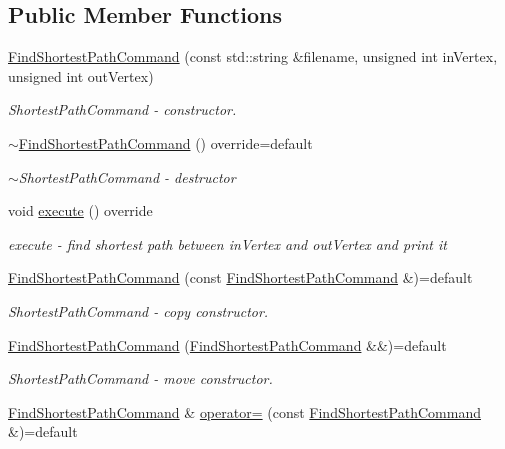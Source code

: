 \subsection*{Public Member Functions}
\begin{DoxyCompactItemize}
\item 
\hyperlink{a00005_a50a520c9a9fd4b962757be360b5e344f_a50a520c9a9fd4b962757be360b5e344f}{Find\+Shortest\+Path\+Command} (const std\+::string \&filename, unsigned int in\+Vertex, unsigned int out\+Vertex)
\begin{DoxyCompactList}\small\item\em Shortest\+Path\+Command -\/ constructor. \end{DoxyCompactList}\item 
\hyperlink{a00005_a69d019f4373486c4bf105dedc534271a_a69d019f4373486c4bf105dedc534271a}{$\sim$\+Find\+Shortest\+Path\+Command} () override=default
\begin{DoxyCompactList}\small\item\em $\sim$\+Shortest\+Path\+Command -\/ destructor \end{DoxyCompactList}\item 
void \hyperlink{a00005_a517885dc57466a93a07d04ddfb68852d_a517885dc57466a93a07d04ddfb68852d}{execute} () override
\begin{DoxyCompactList}\small\item\em execute -\/ find shortest path between in\+Vertex and out\+Vertex and print it \end{DoxyCompactList}\item 
\hyperlink{a00005_a32c4bc563cd2109125f3b3a1ba291409_a32c4bc563cd2109125f3b3a1ba291409}{Find\+Shortest\+Path\+Command} (const \hyperlink{a00005}{Find\+Shortest\+Path\+Command} \&)=default
\begin{DoxyCompactList}\small\item\em Shortest\+Path\+Command -\/ copy constructor. \end{DoxyCompactList}\item 
\hyperlink{a00005_ab2a6cd9a8f8192c12d0bd3d3579a51dc_ab2a6cd9a8f8192c12d0bd3d3579a51dc}{Find\+Shortest\+Path\+Command} (\hyperlink{a00005}{Find\+Shortest\+Path\+Command} \&\&)=default
\begin{DoxyCompactList}\small\item\em Shortest\+Path\+Command -\/ move constructor. \end{DoxyCompactList}\item 
\hyperlink{a00005}{Find\+Shortest\+Path\+Command} \& \hyperlink{a00005_a423cdd822936aa6d72754e83990950a5_a423cdd822936aa6d72754e83990950a5}{operator=} (const \hyperlink{a00005}{Find\+Shortest\+Path\+Command} \&)=default

\end{DoxyCompactItemize}
